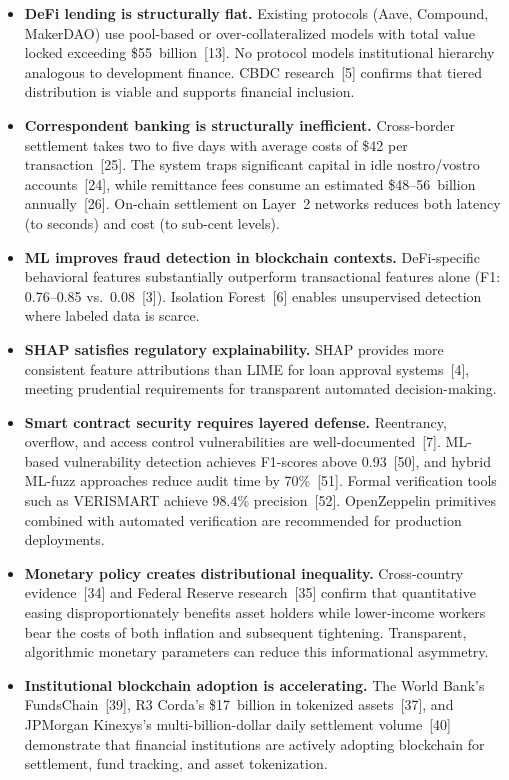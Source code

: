 \documentclass[12pt,a4paper]{report}
\begin{document}
\begin{itemize}[noitemsep]
\item \textbf{DeFi lending is structurally flat.} Existing protocols (Aave, Compound, MakerDAO) use pool-based or over-collateralized models with total value locked exceeding \$55~billion~[13]. No protocol models institutional hierarchy analogous to development finance. CBDC research~[5] confirms that tiered distribution is viable and supports financial inclusion.
\item \textbf{Correspondent banking is structurally inefficient.} Cross-border settlement takes two to five days with average costs of \$42 per transaction~[25]. The system traps significant capital in idle nostro/vostro accounts~[24], while remittance fees consume an estimated \$48--56~billion annually~[26]. On-chain settlement on Layer~2 networks reduces both latency (to seconds) and cost (to sub-cent levels).
\item \textbf{ML improves fraud detection in blockchain contexts.} DeFi-specific behavioral features substantially outperform transactional features alone (F1: 0.76--0.85 vs.\ 0.08~[3]). Isolation Forest~[6] enables unsupervised detection where labeled data is scarce.
\item \textbf{SHAP satisfies regulatory explainability.} SHAP provides more consistent feature attributions than LIME for loan approval systems~[4], meeting prudential requirements for transparent automated decision-making.
\item \textbf{Smart contract security requires layered defense.} Reentrancy, overflow, and access control vulnerabilities are well-documented~[7]. ML-based vulnerability detection achieves F1-scores above 0.93~[50], and hybrid ML-fuzz approaches reduce audit time by 70\%~[51]. Formal verification tools such as VERISMART achieve 98.4\% precision~[52]. OpenZeppelin primitives combined with automated verification are recommended for production deployments.
\item \textbf{Monetary policy creates distributional inequality.} Cross-country evidence~[34] and Federal Reserve research~[35] confirm that quantitative easing disproportionately benefits asset holders while lower-income workers bear the costs of both inflation and subsequent tightening. Transparent, algorithmic monetary parameters can reduce this informational asymmetry.
\item \textbf{Institutional blockchain adoption is accelerating.} The World Bank's FundsChain~[39], R3 Corda's \$17~billion in tokenized assets~[37], and JPMorgan Kinexys's multi-billion-dollar daily settlement volume~[40] demonstrate that financial institutions are actively adopting blockchain for settlement, fund tracking, and asset tokenization.

\end{itemize}
\end{document}
